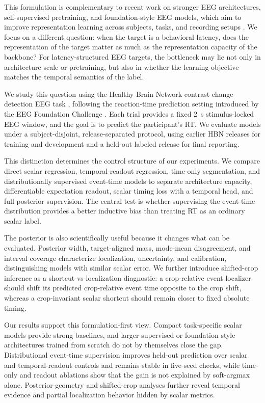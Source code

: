 \documentclass[12pt]{article}
\begin{document}
This formulation is complementary to recent work on stronger EEG architectures, self-supervised pretraining, and foundation-style EEG models, which aim to improve representation learning across subjects, tasks, and recording setups \citep{wang2024eegpt,Jiang2024LaBraM,Chen2024EEGFormer,Wang2025EEGMamba,ElOuahidi2025REVE,Yue2024BrainGPT}. We focus on a different question: when the target is a behavioral latency, does the representation of the target matter as much as the representation capacity of the backbone? For latency-structured EEG targets, the bottleneck may lie not only in architecture scale or pretraining, but also in whether the learning objective matches the temporal semantics of the label.

We study this question using the Healthy Brain Network contrast change detection EEG task \citep{Shirazi2024HBNEEG}, following the reaction-time prediction setting introduced by the EEG Foundation Challenge \citep{EEGFoundationChallengeArxiv2025,EEGChallengeWebsite2025}. Each trial provides a fixed 2~s stimulus-locked EEG window, and the goal is to predict the participant's RT. We evaluate models under a subject-disjoint, release-separated protocol, using earlier HBN releases for training and development and a held-out labeled release for final reporting.

This distinction determines the control structure of our experiments. We compare direct scalar regression, temporal-readout regression, time-only segmentation, and distributionally supervised event-time models to separate architecture capacity, differentiable expectation readout, scalar timing loss with a temporal head, and full posterior supervision. The central test is whether supervising the event-time distribution provides a better inductive bias than treating RT as an ordinary scalar label.

The posterior is also scientifically useful because it changes what can be evaluated. Posterior width, target-aligned mass, mode-mean disagreement, and interval coverage characterize localization, uncertainty, and calibration, distinguishing models with similar scalar error. We further introduce shifted-crop inference as a shortcut-vs-localization diagnostic: a crop-relative event localizer should shift its predicted crop-relative event time opposite to the crop shift, whereas a crop-invariant scalar shortcut should remain closer to fixed absolute timing.

Our results support this formulation-first view. Compact task-specific scalar models provide strong baselines, and larger supervised or foundation-style architectures trained from scratch do not by themselves close the gap. Distributional event-time supervision improves held-out prediction over scalar and temporal-readout controls and remains stable in five-seed checks, while time-only and readout ablations show that the gain is not explained by soft-argmax alone. Posterior-geometry and shifted-crop analyses further reveal temporal evidence and partial localization behavior hidden by scalar metrics.
\end{document}
